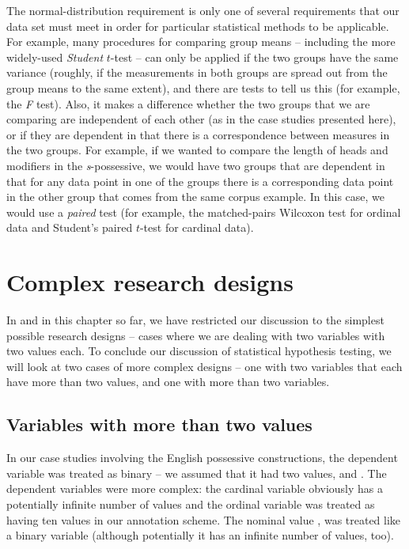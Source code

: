 The normal\hyp{}distribution  requirement is only one of several requirements that our data set must meet in order for particular statistical methods to be applicable. For example, many procedures for comparing group means -- including the more widely\hyp{}used \textit{Student} $t$\hyp{}test  -- can only be applied if the two groups have the same variance  (roughly, if the measurements in both groups are spread out from the group means to the same extent), and there are tests to tell us this (for example, the \textit{F} test). Also, it makes a difference whether the two groups that we are comparing are independent of each other (as in the case studies presented here), or if they are dependent in that there is a correspondence between measures in the two groups. For example, if we wanted to compare the length of heads and modifiers in the \textit{s}-possessive,  we would have two groups that are dependent in that for any data point in one of the groups there is a corresponding data point in the other group that comes from the same corpus example. In this case, we would use a \textit{paired} test (for example, the matched\hyp{}pairs Wilcoxon  test for ordinal  data and Student's paired $t$\hyp{}test  for cardinal  data).

\section{Complex research designs}
\label{sec:complexdesigns}

In  and in this chapter so far, we have restricted our discussion to the simplest possible research designs  -- cases where we are dealing with two variables with two values each. To conclude our discussion of statistical hypothesis testing, we will look at two cases of more complex designs -- one with two variables that each have more than two values, and one with more than two variables.

\subsection{Variables with more than two values}\label{sec:morethantwovalues}\largerpage

In our case studies involving the English possessive constructions, the dependent variable  was treated as binary -- we assumed that it had two values,  and .  The dependent variables were more complex: the cardinal  variable   obviously has a potentially infinite number of values and the ordinal  variable   was treated as having ten values in our annotation  scheme. The nominal  value , was treated like a binary variable (although potentially it has an infinite number of values, too).

